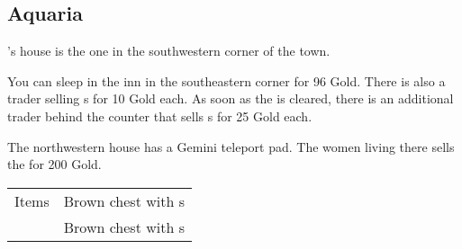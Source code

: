 \subsection{Aquaria}
\label{map:aquaria}

's house is the one in the southwestern corner of the town. 

You can sleep in the inn in the southeastern corner for 96 Gold. There is also a trader selling s for 10 Gold each.  As soon as the  is cleared, there is an additional trader behind the counter that sells s for 25 Gold each.

The northwestern house has a Gemini teleport pad. The women living there sells the  for 200 Gold.

\begin{longtable}{ l p{9cm} }
	Items & Brown chest with \nameref{item:heal_potion}s \\
	& Brown chest with \nameref{item:refresher}s
\end{longtable}

